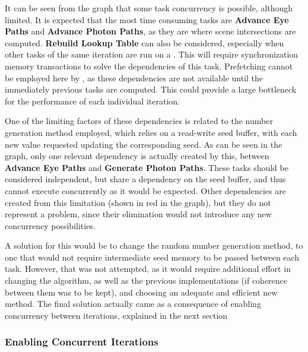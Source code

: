 \documentclass[main.tex]{subfiles}
\begin{document}

It can be seen from the graph that some task concurrency is possible, although limited. It is expected that the most time consuming tasks are \textbf{Advance Eye Paths} and \textbf{Advance Photon Paths}, as they are where scene intersections are computed. \textbf{Rebuild Lookup Table} can also be considered, especially when other tasks of the same iteration are run on a \gpu. This will require synchronization memory transactions to solve the dependencies of this task. Prefetching cannot be employed here by \starpu, as these dependencies are not available until the immediately previous tasks are computed. This could provide a large bottleneck for the performance of each individual iteration.

One of the limiting factors of these dependencies is related to the number generation method employed, which relies on a read-write seed buffer, with each new value requested updating the corresponding seed. As can be seen in the graph, only one relevant dependency is actually created by this, between \textbf{Advance Eye Paths} and \textbf{Generate Photon Paths}. These tasks should be considered independent, but share a dependency on the seed buffer, and thus cannot execute concurrently as it would be expected. Other dependencies are created from this limitation (shown in red in the graph), but they do not represent a problem, since their elimination would not introduce any new concurrency possibilities.

A solution for this would be to change the random number generation method, to one that would not require intermediate seed memory to be passed between each task. However, that was not attempted, as it would require additional effort in changing the algorithm, as well as the previous implementations (if coherence between them was to be kept), and choosing an adequate and efficient new method. The final solution actually came as a consequence of enabling concurrency between iterations, explained in the next section


\subsubsection{Enabling Concurrent Iterations} \label{section:starpu_concurrent_iters}
\end{document}
